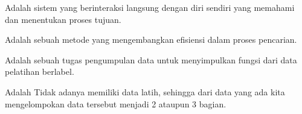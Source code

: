 Adalah sistem yang berinteraksi langsung dengan diri sendiri yang memahami dan menentukan proses tujuan.

Adalah sebuah metode yang mengembangkan efisiensi dalam proses pencarian.

Adalah sebuah tugas pengumpulan data untuk menyimpulkan fungsi dari data pelatihan berlabel.

Adalah Tidak adanya memiliki data latih, sehingga dari data yang ada kita mengelompokan data tersebut menjadi 2 ataupun 3 bagian.
